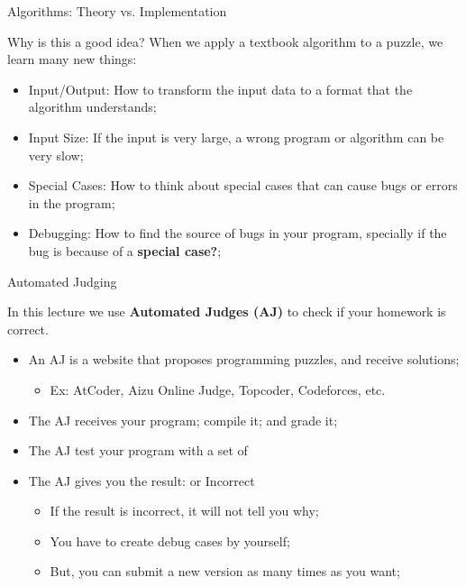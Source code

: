 \begin{frame}{Algorithms: Theory vs. Implementation}
  \begin{exampleblock}{}
  Why is this a good idea? When we apply a textbook algorithm to a puzzle, we learn many new things:
  \end{exampleblock}
  \begin{itemize}
    \item \alert{Input/Output}: How to transform the input data to a format that the algorithm understands;
    \item \alert{Input Size}: If the input is very large, a wrong program or algorithm can be very slow;
    \item \alert{Special Cases}: How to think about special cases that can cause bugs or errors in the program;
    \item \alert{Debugging}: How to find the source of bugs in your program, specially if the bug is because of a {\bf special case?};
  \end{itemize}
\end{frame}

\begin{frame}{Automated Judging}
  \begin{exampleblock}{}
  In this lecture we use {\bf Automated Judges (AJ)} to check if your homework is correct.
  \end{exampleblock}

  \begin{itemize}
    \item An AJ is a website that proposes programming puzzles, and receive solutions;
    \begin{itemize}
      \item Ex: AtCoder, Aizu Online Judge, Topcoder, Codeforces, etc.
    \end{itemize}\bigskip

    \item The AJ receives your program; compile it; and grade it;\bigskip

    \item The AJ test your program with a set of \bigskip

    \item The AJ gives you the result:  or \alert{Incorrect}
    \begin{itemize}
      \item If the result is incorrect, it will not tell you why;
      \item You have to create debug cases by yourself;
      \item But, you can submit a new version as many times as you want;
    \end{itemize}
  \end{itemize}
\end{frame}

